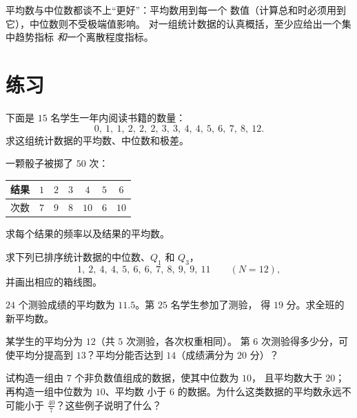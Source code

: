 \begin{remark}
平均数与中位数都谈不上“更好”：平均数用到每一个
数值（计算总和时必须用到它），中位数则不受极端值影响。
对一组统计数据的认真概括，至少应给出一个集中趋势指标
\emph{和}一个离散程度指标。
\end{remark}

\section{练习}

\begin{exercise}[$\star$]\label{exo:g10:stats:1}
下面是 $15$ 名学生一年内阅读书籍的数量：
\[
0,\ 1,\ 1,\ 2,\ 2,\ 2,\ 3,\ 3,\ 4,\ 4,\ 5,\ 6,\ 7,\ 8,\ 12 .
\]
求这组统计数据的平均数、中位数和极差。
\end{exercise}

\begin{exercise}[$\star$]\label{exo:g10:stats:2}
一颗骰子被掷了 $50$ 次：
\begin{center}
\renewcommand{\arraystretch}{1.2}
\begin{tabular}{c|cccccc}
结果 & $1$ & $2$ & $3$ & $4$ & $5$ & $6$ \\
\hline
次数 & $7$ & $9$ & $8$ & $10$ & $6$ & $10$ \\
\end{tabular}
\end{center}
求每个结果的频率以及结果的平均数。
\end{exercise}

\begin{exercise}[$\star$]\label{exo:g10:stats:3}
求下列已排序统计数据的中位数、$Q_1$ 和 $Q_3$，
\[
1,\ 2,\ 4,\ 4,\ 5,\ 6,\ 6,\ 7,\ 8,\ 9,\ 9,\ 11 \qquad (N = 12),
\]
并画出相应的箱线图。
\end{exercise}

\begin{exercise}[$\star$]\label{exo:g10:stats:4}
$24$ 个测验成绩的平均数为 $11.5$。第 $25$ 名学生参加了测验，
得 $19$ 分。求全班的新平均数。
\end{exercise}

\begin{exercise}[$\star\star$]\label{exo:g10:stats:5}
某学生的平均分为 $12$（共 $5$ 次测验，各次权重相同）。
第 $6$ 次测验得多少分，可使平均分提高到 $13$？平均分能否达到
$14$（成绩满分为 $20$ 分）？
\end{exercise}

\begin{exercise}[$\star\star$]\label{exo:g10:stats:6}
试构造一组由 $7$ 个非负数值组成的数据，使其中位数为 $10$，
且平均数大于 $20$；再构造一组中位数为 $10$、平均数
小于 $6$ 的数据。为什么这类数据的平均数永远不可能小于
$\frac{40}{7}$？这些例子说明了什么？
\end{exercise}

